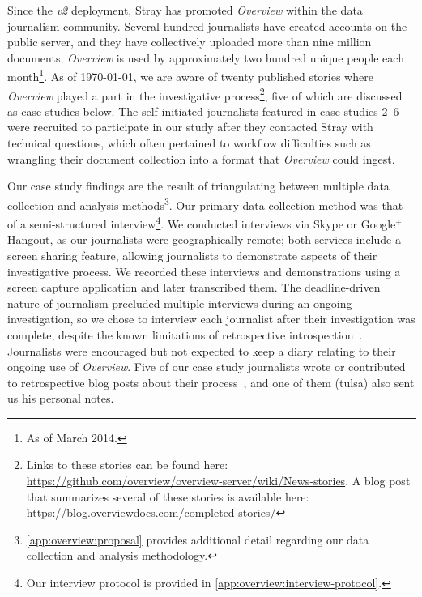 \begin{sloppypar}
Since the {\it v2} deployment, Stray has promoted {\it Overview} within the data journalism community.
Several hundred journalists have created accounts on the public server, and they have collectively uploaded more than nine million documents; {\it Overview} is used by approximately two hundred unique people each month\footnote{As of March 2014.}. 
As of \today, we are aware of twenty published stories where {\it Overview} played a part in the investigative process\footnote{Links to these stories can be found here: \url{https://github.com/overview/overview-server/wiki/News-stories}. A blog post that summarizes several of these stories is available here: \url{https://blog.overviewdocs.com/completed-stories/}}, five of which are discussed as case studies below.
The self-initiated journalists featured in case studies 2--6 were recruited to participate in our study after they contacted Stray with technical questions, which often pertained to workflow difficulties such as wrangling their document collection into a format that {\it Overview} could ingest.
\end{sloppypar}

Our case study findings are the result of triangulating between multiple data collection and analysis methods\footnote{\autoref{app:overview:proposal} provides additional detail regarding our data collection and analysis methodology.}.
Our primary data collection method was that of a semi-structured interview\footnote{Our interview protocol is provided in \autoref{app:overview:interview-protocol}.}.
We conducted interviews via Skype or Google$^+$ Hangout, as our journalists were geographically remote; both services include a screen sharing feature, allowing journalists to demonstrate aspects of their investigative process.
We recorded these interviews and demonstrations using a screen capture application and later transcribed them.
The deadline-driven nature of journalism precluded multiple interviews during an ongoing investigation, so we chose to interview each journalist after their investigation was complete, despite the known limitations of retrospective introspection~\cite{Ericsson1980}.
Journalists were encouraged but not expected to keep a diary relating to their ongoing use of {\it Overview}.
Five of our case study journalists wrote or contributed to retrospective blog posts about their process~\cite{Keller2012a,Stray2012a,Stray2012b,Stray2014,Wade2012a}, and one of them ({\sc tulsa}) also sent us his personal notes.


